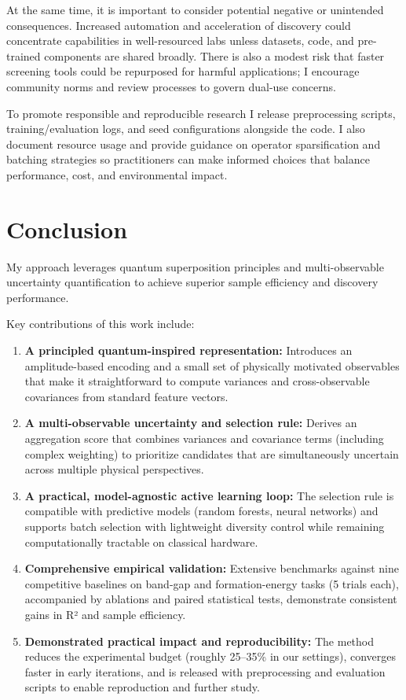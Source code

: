 \documentclass{article}
\begin{document}
At the same time, it is important to consider potential negative or unintended consequences. Increased automation and acceleration of discovery could concentrate capabilities in well-resourced labs unless datasets, code, and pre-trained components are shared broadly. There is also a modest risk that faster screening tools could be repurposed for harmful applications; I encourage community norms and review processes to govern dual-use concerns.

To promote responsible and reproducible research I release preprocessing scripts, training/evaluation logs, and seed configurations alongside the code. I also document resource usage and provide guidance on operator sparsification and batching strategies so practitioners can make informed choices that balance performance, cost, and environmental impact.

\section{Conclusion}
\label{sec:conclusion}

My approach leverages quantum superposition principles and multi-observable uncertainty quantification to achieve superior sample efficiency and discovery performance.

Key contributions of this work include:

\begin{enumerate}
    \item \textbf{A principled quantum-inspired representation:} Introduces an amplitude-based encoding and a small set of physically motivated observables that make it straightforward to compute variances and cross-observable covariances from standard feature vectors.
    \item \textbf{A multi-observable uncertainty and selection rule:} Derives an aggregation score that combines variances and covariance terms (including complex weighting) to prioritize candidates that are simultaneously uncertain across multiple physical perspectives.
    \item \textbf{A practical, model-agnostic active learning loop:} The selection rule is compatible with predictive models (random forests, neural networks) and supports batch selection with lightweight diversity control while remaining computationally tractable on classical hardware.
    \item \textbf{Comprehensive empirical validation:} Extensive benchmarks against nine competitive baselines on band-gap and formation-energy tasks (5 trials each), accompanied by ablations and paired statistical tests, demonstrate consistent gains in R² and sample efficiency.
    \item \textbf{Demonstrated practical impact and reproducibility:} The method reduces the experimental budget (roughly 25–35\% in our settings), converges faster in early iterations, and is released with preprocessing and evaluation scripts to enable reproduction and further study.
\end{enumerate}
\end{document}
